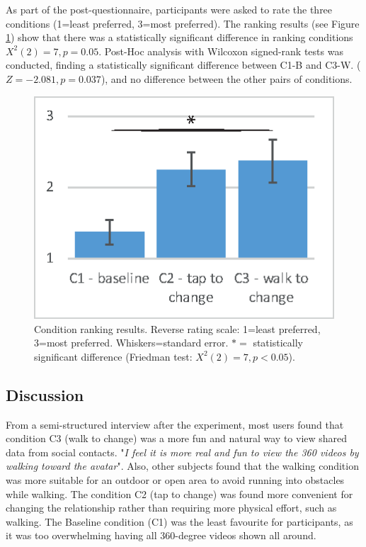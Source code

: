 As part of the post-questionnaire, participants were asked to rate the three conditions (1=least preferred, 3=most preferred). The ranking results (see Figure \ref{fig:data:ranking}) show that there was a statistically significant difference in ranking conditions $X^2(2)=7, p=0.05$. Post-Hoc analysis with Wilcoxon signed-rank tests was conducted, finding a statistically significant difference between C1-B and C3-W. ($Z=-2.081, p=0.037$), and no difference between the other pairs of conditions.

\begin{figure}[h]
  \centering
  \includegraphics[width=.8\linewidth]{images/chi/images-05.eps}
  \caption{Condition ranking results. Reverse rating scale: 1=least preferred, 3=most preferred. Whiskers=standard error. $*=$ statistically significant difference (Friedman test: $X^2(2)=7, p<0.05$).}  
      \label{fig:data:ranking}
\end{figure}

\subsection{Discussion}

From a semi-structured interview after the experiment, most users found that condition C3 (walk to change) was a more fun and natural way to view shared data from social contacts. "\textit{I feel it is more real and fun to view the 360 videos by walking toward the avatar}". Also, other subjects found that the walking condition was more suitable for an outdoor or open area to avoid running into obstacles while walking. The condition C2 (tap to change) was found more convenient for changing the relationship rather than requiring more physical effort, such as walking. The Baseline condition (C1) was the least favourite for participants, as it was too overwhelming having all 360-degree videos shown all around. 

